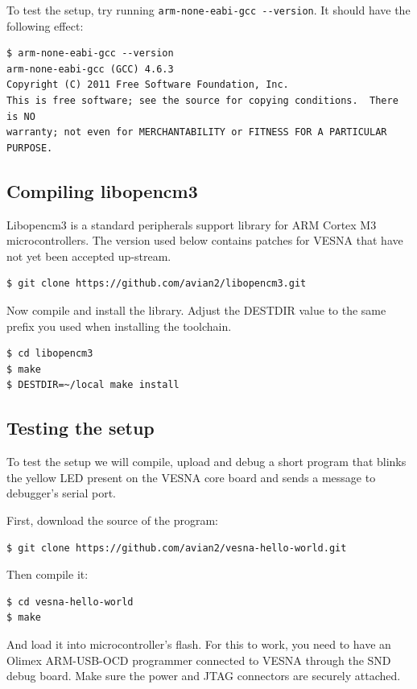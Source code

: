 \documentclass[a4paper, 10pt]{article}
\begin{document}
To test the setup, try running \verb|arm-none-eabi-gcc --version|. It should have the
following effect:

\begin{verbatim}
$ arm-none-eabi-gcc --version
arm-none-eabi-gcc (GCC) 4.6.3
Copyright (C) 2011 Free Software Foundation, Inc.
This is free software; see the source for copying conditions.  There is NO
warranty; not even for MERCHANTABILITY or FITNESS FOR A PARTICULAR PURPOSE.
\end{verbatim}

\subsection{Compiling libopencm3}

Libopencm3 is a standard peripherals support library for ARM Cortex M3
microcontrollers. The version used below contains patches for VESNA that have
not yet been accepted up-stream.

\begin{verbatim}
$ git clone https://github.com/avian2/libopencm3.git
\end{verbatim}

Now compile and install the library. Adjust the DESTDIR value to the same prefix
you used when installing the toolchain.

\begin{verbatim}
$ cd libopencm3
$ make
$ DESTDIR=~/local make install
\end{verbatim}

\subsection{Testing the setup}

To test the setup we will compile, upload and debug a short program that blinks
the yellow LED present on the VESNA core board and sends a message to debugger's
serial port.

First, download the source of the program:

\begin{verbatim}
$ git clone https://github.com/avian2/vesna-hello-world.git
\end{verbatim}

Then compile it:

\begin{verbatim}
$ cd vesna-hello-world
$ make
\end{verbatim}

And load it into microcontroller's flash. For this to work, you need to have an
Olimex ARM-USB-OCD programmer connected to VESNA through the SND debug board.
Make sure the power and JTAG connectors are securely attached.
\end{document}
